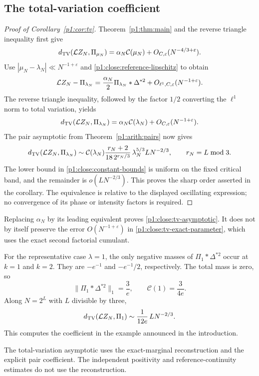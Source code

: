 \subsection{The total-variation coefficient}
\label{p14:comp:tv}

\begin{proof}[Proof of Corollary~\ref{p1:cor:tv}]
Theorem~\ref{p1:thm:main} and the reverse triangle
inequality first give
\[
 d_{\mathrm{TV}}(\mathcal L Z_N,\Pi_{\mu_N})
 =\alpha_N\mathcal C(\mu_N)
            +O_{C,\varepsilon}(N^{-4/3+\varepsilon}).
\]
Use \(|\mu_N-\lambda_N|\ll N^{-1+\varepsilon}\) and
\eqref{p1:close:reference-lipschitz} to obtain
\[
 \mathcal L Z_N-\Pi_{\lambda_N}
   =\frac{\alpha_N}{2}\Pi_{\lambda_N}*\Delta^{*2}
          +O_{\ell^1,C,\varepsilon}(N^{-1+\varepsilon}).
\]
The reverse triangle inequality, followed by the factor
$1/2$ converting the $\ell^1$ norm to total variation,
yields
\begin{equation}
 d_{\mathrm{TV}}(\mathcal L Z_N,\Pi_{\lambda_N})
      =\alpha_N\mathcal C(\lambda_N)
          +O_{C,\varepsilon}(N^{-1+\varepsilon}).
 \label{p1:close:tv-exact-parameter}
\end{equation}
The pair asymptotic from
Theorem~\ref{p1:arith:pairs} now gives
\begin{equation}
 d_{\mathrm{TV}}(\mathcal L Z_N,\Pi_{\lambda_N})
 \sim \mathcal C(\lambda_N)
       \frac{r_N+2}{18\,2^{r_N/3}}\,
       \lambda_N^{5/3}L N^{-2/3},
 \qquad r_N=L\bmod3.
 \label{p1:close:tv-asymptotic}
\end{equation}
The lower bound in \eqref{p1:close:constant-bounds} is uniform
on the fixed critical band, and the remainder is
$o(LN^{-2/3})$.  This proves the sharp order asserted in the
corollary.  The equivalence is relative to the displayed
oscillating expression; no convergence of its phase or
intensity factors is required.
\end{proof}

Replacing $\alpha_N$ by its leading equivalent proves
\eqref{p1:close:tv-asymptotic}.  It does not by itself preserve
the error $O(N^{-1+\varepsilon})$ in
\eqref{p1:close:tv-exact-parameter}, which uses the exact
second factorial cumulant.

For the representative case $\lambda=1$, the only negative
masses of $\Pi_1*\Delta^{*2}$ occur at $k=1$ and $k=2$.
They are $-e^{-1}$ and $-e^{-1}/2$, respectively.
The total mass is zero, so
\[
 \|\Pi_1*\Delta^{*2}\|_1=\frac3e,
 \qquad
 \mathcal C(1)=\frac3{4e}.
\]
Along $N=2^L$ with $L$ divisible by three,
\begin{equation}
 d_{\mathrm{TV}}(\mathcal L Z_N,\Pi_1)
       \sim \frac1{12e}\,L N^{-2/3}.
 \label{p1:close:dyadic-example}
\end{equation}
This computes the coefficient in the example announced in
the introduction.

The total-variation asymptotic uses the exact-marginal reconstruction
and the explicit pair coefficient. The independent positivity and
reference-continuity estimates do not use the reconstruction.
